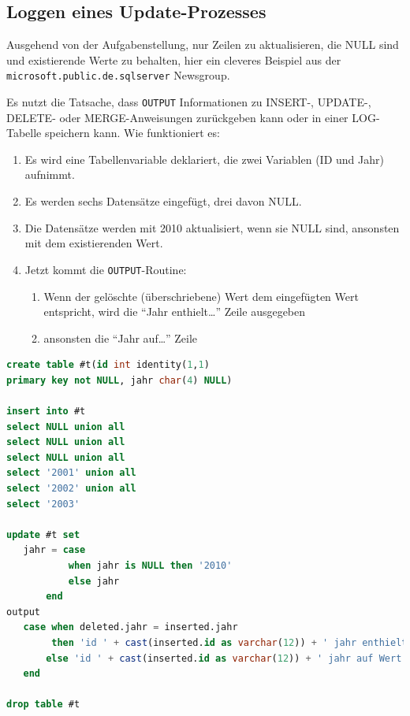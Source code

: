 \documentclass[12pt,ngerman,a4paper,index=totoc,twoside]{scrartcl}
\newcommand{\hint}[1]{\textcolor{hint}{\texttt{#1}}}
\newcommand{\lwidth}{0.75}
\begin{document}
\subsection{Loggen eines Update-Prozesses}

Ausgehend von der Aufgabenstellung, nur Zeilen zu aktualisieren, die NULL sind und existierende Werte zu behalten, hier ein cleveres Beispiel aus der \hint{microsoft.public.de.sqlserver} Newsgroup.

Es nutzt die Tatsache, dass \hint{OUTPUT} Informationen zu INSERT-, UPDATE-, DELETE- oder MERGE-Anweisungen zurückgeben kann oder in einer LOG-Tabelle speichern kann. Wie funktioniert es:

\begin{enumerate}
 \item Es wird eine Tabellenvariable deklariert, die zwei Variablen (ID und Jahr) aufnimmt.
 \item Es werden sechs Datensätze eingefügt, drei davon NULL.
 \item Die Datensätze werden mit 2010 aktualisiert, wenn sie NULL sind, ansonsten mit dem existierenden Wert.
 \item Jetzt kommt die \hint{OUTPUT}-Routine:
\begin{enumerate}
 \item Wenn der gelöschte (überschriebene) Wert dem eingefügten Wert entspricht, wird die "`Jahr enthielt\ldots"' Zeile ausgegeben
 \item ansonsten die "`Jahr auf\ldots"' Zeile
 \end{enumerate}
\end{enumerate}



\begin{center}
\begin{minipage}{\lwidth\textwidth}
\begin{lstlisting}[language={SQL},caption={},label={tricks:output1}]
create table #t(id int identity(1,1) 
primary key not NULL, jahr char(4) NULL)

insert into #t
select NULL union all
select NULL union all
select NULL union all
select '2001' union all
select '2002' union all
select '2003'

update #t set
   jahr = case
           when jahr is NULL then '2010'
           else jahr
       end
output
   case when deleted.jahr = inserted.jahr 
        then 'id ' + cast(inserted.id as varchar(12)) + ' jahr enthielt Wert ' + deleted.jahr
       else 'id ' + cast(inserted.id as varchar(12)) + ' jahr auf Wert ' + inserted.jahr + ' gesetzt'
   end

drop table #t \end{lstlisting}
\end{minipage}
\end{center}  
\end{document}
